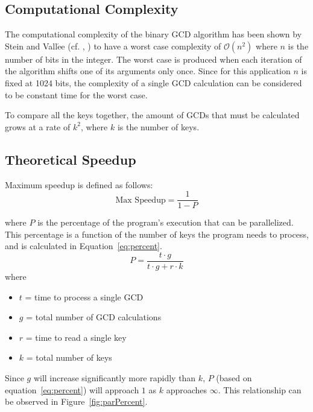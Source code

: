 \documentclass[smallextended]{svjour3}       %
\begin{document}
\subsection{Computational Complexity}
\label{subsec:compcomp}
The computational complexity of the binary GCD algorithm has been shown by 
Stein and Vall$\acute{\text{e}}$e (cf. \cite{stein1967computational}, 
\cite{vallee1998complete}) to have a worst case complexity of $\mathcal{O}(n^2)$ 
where $n$ is the number of bits in the integer. The worst case is produced 
when each iteration of the algorithm shifts one of its arguments only once. 
Since for this application $n$ is fixed at 1024 bits, the complexity of a 
single GCD calculation can be considered to be constant time for the worst case.

To compare all the keys together, the amount of GCDs that must be calculated 
grows at a rate of $k^2$, where $k$ is the number of keys.

\subsection{Theoretical Speedup}
\label{subsec:theory}
Maximum speedup is defined as follows:
\begin{equation}
   \mbox{Max Speedup} = \frac{1}{1 - P}
   \label{eq:speed}
\end{equation}

where $P$ is the percentage of the program's execution that can be parallelized.
This percentage is a function of the number of keys the program needs to 
process, and is calculated in Equation~\ref{eq:percent}.
\begin{equation}
P = \frac{t \cdot g}{t \cdot g + r \cdot k}
   \label{eq:percent}
\end{equation}
where
\begin{itemize}
   \item $t$ = time to process a single GCD
   \item $g$ = total number of GCD calculations
   \item $r$ = time to read a single key
   \item $k$ = total number of keys
\end{itemize}

Since $g$ will increase significantly more rapidly than $k$, $P$ (based on 
equation~\ref{eq:percent}) will approach $1$ as $k$ approaches 
$\infty$. This relationship can be observed in Figure~\ref{fig:parPercent}.
\end{document}
